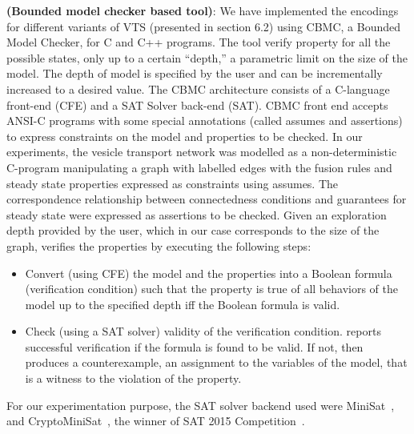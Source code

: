 \textbf{{\sattool} (Bounded model checker based tool)}:
	We have implemented the encodings for different variants of VTS (presented in section 6.2) using CBMC, a Bounded Model Checker, for C and C++ programs. 
%
%
The tool verify property for all the possible states, only up to a certain “depth,” a parametric limit on the size of the model.
%
The depth of model is specified by the user and can be  incrementally increased to a desired value.
%
The CBMC architecture consists of a C-language front-end (CFE) and a SAT Solver back-end (SAT). 
%
CBMC front end accepts ANSI-C programs with some special annotations (called assumes and assertions) to express constraints on the model and properties to be checked. 
%	
In our experiments, the vesicle transport network was modelled as a non-deterministic C-program manipulating a graph with labelled edges with the fusion rules and steady state properties expressed as constraints using assumes. 
%		
The correspondence relationship between connectedness conditions
and guarantees for steady state were expressed as assertions to be checked. 
%		
Given an exploration depth provided by the user, which in our case corresponds to the size of the graph, {\sattool} verifies the properties by executing the following steps:
	\begin{itemize}
	\item Convert (using CFE) the model and the properties into a Boolean formula (verification condition) such that the property is true of all behaviors of the model up to the specified
depth iff the Boolean formula is valid.
	\item Check (using a SAT solver) validity of the verification condition. {\sattool} reports successful verification if the formula is found to be valid. If not, then {\sattool} produces a counterexample,
an assignment to the variables of the model, that is a witness to the violation of the property.
	\end{itemize}
For our experimentation purpose, the SAT solver backend used were MiniSat~\cite{sorensson2005minisat}, and CryptoMiniSat~\cite{soos2016cryptominisat}, the winner of SAT 2015 Competition~\cite{balyo2016sat}. 


